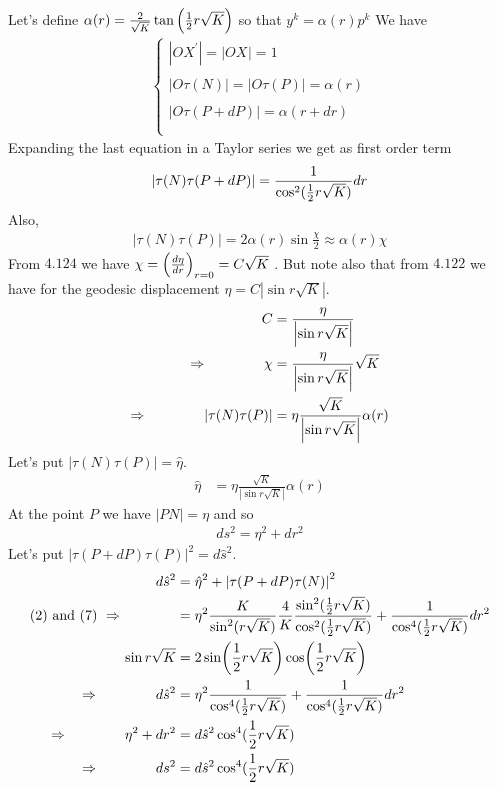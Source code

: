 Let's define $\alpha (r) = \frac{2}{\sqrt{K}}\tan\left(\frac{1}{2} r \sqrt{K}\right)$ so that $y^k = \alpha (r)p^k$
We have 
\begin{align}
\left\{\begin{array}{l}
\left|OX^{'}\right|= \left|OX^{}\right|=1\\\\
\left|O\tau (N)\right|= \left|O\tau (P)\right|=\alpha (r)\\\\
 \left|O\tau (P+dP)\right|=\alpha (r+dr)\\\\
\end{array}
\right.
\end{align}
Expanding the last equation in a Taylor series we get as first order term
\begin{align}
\left|\tau (N)\tau (P+dP)\right|= \frac{1}{\cos^2(\frac{1}{2} r \sqrt{K})}dr
\end{align}
Also,
\begin{align}
\left|\tau (N)\tau (P)\right|= 2\alpha (r)\sin \frac{\chi}{2}  \approx \alpha (r) \chi 
\end{align}
From $\mathbf{4.124}$ we have $\chi=\left(\dv{\eta}{r}\right)_{r=0}= C\sqrt{K}$  .
But note also that from $\mathbf{4.122}$ we have for the geodesic displacement $\eta = C\left|\sin r\sqrt{K}\right|$. 
\begin{align}
C&= \frac{\eta }{\left|\sin r\sqrt{K}\right|}\\
\Rightarrow \quad\quad\quad\quad \chi&=\frac{\eta }{\left|\sin r\sqrt{K}\right|}\sqrt{K}\\
\Rightarrow \quad\quad\quad\quad \left|\tau (N)\tau (P)\right|&=\eta\frac{\sqrt{K} }{\left|\sin r\sqrt{K}\right|}\alpha (r) 
\end{align}
Let's put $\left|\tau (N)\tau (P)\right|=\hat{\eta}$.
\begin{align}
\hat{\eta}&=\eta\frac{\sqrt{K} }{\left|\sin r\sqrt{K}\right|}\alpha (r) 
\end{align}
At the point $P$ we have $\left|PN\right| = \eta$ and so
\begin{align}
ds^2=\eta^2+ dr^2
\end{align}
Let's put $\left|\tau(P+dP)\tau(P)\right|^2=d\hat{s}^2$.
\begin{align}
d\hat{s}^2 &= \hat{\eta}^2+\left|\tau(P+dP)\tau(N)\right|^2\\
\text{(2) and (7) }\Rightarrow\quad\quad\quad\quad &= \eta^2\frac{K }{\sin^2 (r\sqrt{K})}\frac{4}{K}\frac{\sin^2 (\frac{1}{2} r \sqrt{K})}{\cos^2 (\frac{1}{2} r \sqrt{K})}+ \frac{1}{\cos^4(\frac{1}{2} r \sqrt{K})}dr^2\\
\sin r\sqrt{K} &= 2\sin (\frac{1}{2} r\sqrt{K})\cos (\frac{1}{2} r\sqrt{K})\\
\Rightarrow\quad\quad\quad\quad  d\hat{s}^2 &= \eta^2\frac{1}{\cos^4 (\frac{1}{2} r \sqrt{K})}+ \frac{1}{\cos^4(\frac{1}{2} r \sqrt{K})}dr^2\\
\Rightarrow\quad\quad\quad\quad \eta^2+dr^2 &= d \hat{s}^2 \cos^4(\frac{1}{2} r \sqrt{K})\\
\Rightarrow\quad\quad\quad\quad ds^2 &= d \hat{s}^2 \cos^4(\frac{1}{2} r \sqrt{K})
\end{align}
